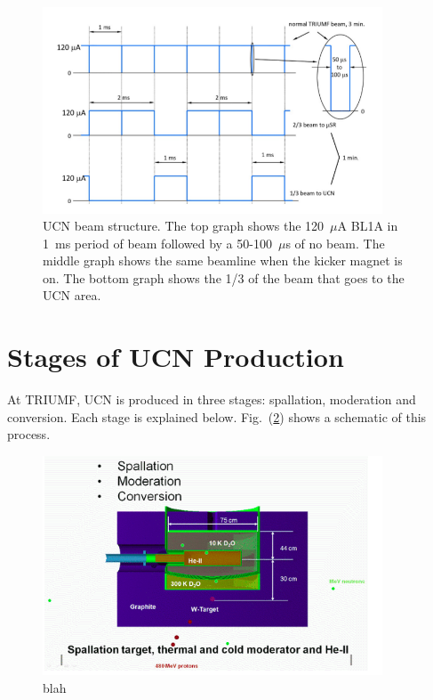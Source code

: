 \begin{figure}[h]
  \centering
  \includegraphics[width=0.9\textwidth]{bl1u.png}
  \caption{UCN beam structure. The top graph shows the 120~$\mu$A BL1A
    in 1~ms period of beam followed by a 50-100~$\mu$s of no
    beam. The middle graph shows the same beamline when the kicker
    magnet is on. The bottom graph shows the 1/3 of the beam that goes
    to the UCN area.}
  \label{fig:bl1u}
\end{figure}


\section{Stages of UCN Production}
At TRIUMF, UCN is produced in three stages: spallation, moderation and
conversion. Each stage is explained
below. Fig.~(\ref{fig:ucn_production_stages}) shows a schematic of
this process.

\begin{figure}[h]
  \centering
  \includegraphics[width=0.9\textwidth]{ucn_production_stages.png}
  \caption{blah}
  \label{fig:ucn_production_stages}
\end{figure}


